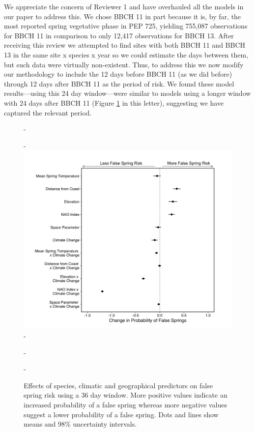 \documentclass[11pt,a4paper]{article}\usepackage[]{graphicx}\usepackage[]{color}
\begin{document}
We appreciate the concern of Reviewer 1 and have overhauled all the models in our paper to address this. We chose BBCH 11 in part because it is, by far, the most reported spring vegetative phase in PEP 725, yielding 755,087 observations for BBCH 11 in comparison to only 12,417 observations for BBCH 13. After receiving this review we attempted to find sites with both BBCH 11 and BBCH 13 in the same site x species x year so we could estimate the days between them, but such data were virtually non-existent. Thus, to address this we now modify our methodology to include the 12 days before BBCH 11 (as we did before) through 12 days after BBCH 11 as the period of risk. We found these model results---using this 24 day window---were similar to models using a longer window with 24 days after BBCH 11 (Figure \ref{fig:spp} in this letter), suggesting we have captured the relevant period.\\ 

{\begin{figure} [H]
  -\begin{center}
  -\includegraphics[width=12cm]{..//..//analyses/figures/model_output_98_verylong.png}
  -\caption{Effects of species, climatic and geographical predictors on false spring risk using a 36 day window. More positive values indicate an increased probability of a false spring whereas more negative values suggest a lower probability of a false spring. Dots and lines show means and 98\% uncertainty intervals.}\label{fig:spp}
  -\end{center}
  -\end{figure}}
\end{document}
